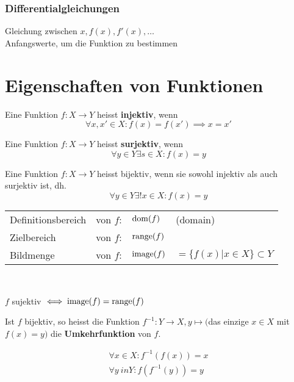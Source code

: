 \subsubsection{Differentialgleichungen}
Gleichung zwischen $x, f(x), f'(x), \dotsc$\\
Anfangswerte, um die Funktion zu bestimmen

\section{Eigenschaften von Funktionen}
\begin{def*}[note = Injektivität , index = Injektivität]
	Eine Funktion $f: X \rightarrow Y$ heisst \textbf{injektiv}, wenn\\
	\[ \forall x, x' \in X : f(x) = f(x') \implies x = x' \]
\end{def*}
\begin{def*}[note = Surjektivität , index = Surjektivität]
	Eine Funktion $f: X \rightarrow Y$ heisst \textbf{surjektiv}, wenn\\
	\[ \forall y \in Y \exists s \in X : f(x) = y \]
\end{def*}
\begin{def*}[note = Bijektivität , index = Bijektivität]
	Eine Funktion $f: X \rightarrow Y$ heisst bijektiv, wenn sie sowohl injektiv als auch surjektiv ist, dh. \\
	\[ \forall y \in Y \exists! x \in X : f(x) = y \]
\end{def*}
\begin{tabular}{l l l l}
	Definitionsbereich	&von $f$:	&$\operatorname{dom}(f)$	&(domain)					\\
	Zielbereich			&von $f$:	&$\operatorname{range}(f)$							\\
	Bildmenge			&von $f$:	&$\operatorname{image}(f)$	&$= \{ f(x) | x \in X \} \subset Y$	
\end{tabular}\\
\begin{bem}
	$f$ sujektiv $\iff \operatorname{image}(f) = \operatorname{range}(f)$
\end{bem}
\begin{def*}[note = Umkehrfunktion , index = Umkehrfunktion]
	Ist $f$ bijektiv, so heisst die Funktion $f^{-1}: Y \rightarrow X, y \mapsto ($das einzige $x \in X$ mit $f(x) = y)$ die \textbf{Umkehrfunktion} von $f$.
\end{def*}
\begin{bem}
	\begin{gather*}
		\forall x \in X : f^{-1}(f(x)) = x \\
		\forall y \ in Y : f(f^{-1}(y)) = y
	\end{gather*}
\end{bem}
